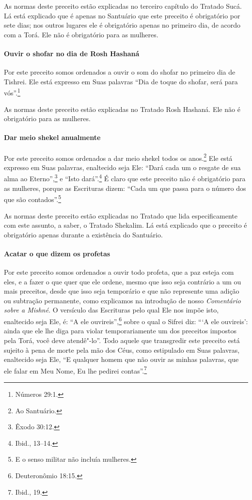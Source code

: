 \begin{multicols}{2}
As normas deste preceito estão explicadas no terceiro capítulo do
Tratado Sucá\starr. Lá está explicado que é apenas no Santuário que este
preceito é obrigatório por sete dias; nos outros lugares ele é
obrigatório apenas no primeiro dia, de acordo com a Torá\starr. Ele não é
obrigatório para as mulheres.

\paragraph{Ouvir o shofar\starr{} no dia de Rosh Hashaná\starr}

Por este preceito somos ordenados a ouvir o som do shofar\starr{} no
primeiro dia de Tishrei\starr. Ele está expresso em Suas palavras ``Dia de
toque do shofar\starr, será para vós''.\footnote{Números 29:1.}

As normas deste preceito estão explicadas no Tratado Rosh Hashaná\starr. Ele
não é obrigatório para as mulheres.

\paragraph{Dar meio shekel\starr{} anualmente}

Por este preceito somos ordenados a dar meio
shekel\starr{} todos os anos.\footnote{Ao Santuário.}
Ele está expresso em Suas palavras, enaltecido seja Ele: ``Dará cada um
o resgate de sua alma ao Eterno'',\footnote{Êxodo 30:12.} e ``Isto dará''.\footnote{Ibid., 13--14.} É claro que este preceito não é obrigatório para as mulheres,
porque as Escrituras dizem: ``Cada um que passa para o número dos que
são contados''.\footnote{E o senso militar não incluía mulheres.}

As normas deste preceito estão explicadas no Tratado que lida
especificamente com este assunto, a saber, o Tratado Shekalim\starr. Lá está
explicado que o preceito é obrigatório apenas durante a existência do
Santuário.

\paragraph{Acatar o que dizem os profetas}

Por este preceito somos ordenados a ouvir todo profeta, que a paz esteja
com eles, e a fazer o que quer que ele ordene, mesmo que isso seja contrário a um ou mais preceitos, desde que isso seja temporário e que não
represente uma adição ou subtração permanente, como explicamos na
introdução de nosso \emph{Comentário sobre a Mishné}. O versículo das
Escrituras pelo qual Ele nos impõe isto, enaltecido seja Ele, é: ``A ele
ouvireis'',\footnote{Deuteronômio 18:15.} sobre o qual o Sifrei\starr{} diz: ```A ele
ouvireis': ainda que ele lhe diga para violar temporariamente um dos
preceitos impostos pela Torá\starr, você deve atendê"-lo''. Todo aquele que
transgredir este preceito está sujeito à pena de morte pela mão dos
Céus, como estipulado em Suas palavras, enaltecido seja Ele, ``E
qualquer homem que não ouvir as minhas palavras, que ele falar em Meu
Nome, Eu lhe pedirei contas''.\footnote{Ibid., 19.}


\end{multicols}

